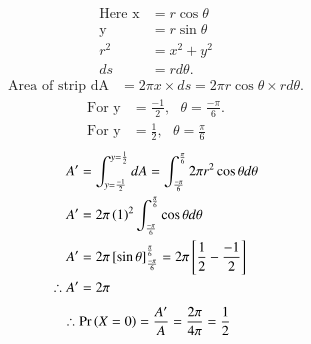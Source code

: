 \documentclass[journal,12pt,twocolumn]{IEEEtran}
\begin{document}
\begin{align}
\text{Here x} &= r\cos{\theta}
\\\text{y} &=r\sin{\theta}
\\r^2 &= x^2 + y^2
\\ds &= rd\theta.
\end{align}
\begin{align}
    \text{Area of strip dA} &= 2\pi x\times ds
    = 2\pi  r\cos{\theta} \times rd\theta.
\end{align}
\begin{align}
    \text{For y} &=\frac{-1}{2}, \text{ }\theta = \frac{-\pi}{6}.
    \\\text{For y} &=\frac{1}{2}, \text{ }\theta = \frac{\pi}{6} 
\end{align}
\begin{align}
    A^\prime &= \int_{y = \frac{-1}{2}}^{y = \frac{1}{2}} dA = \int_{\frac{-\pi}{6}}^{\frac{\pi}{6}} 2\pi r^2 \cos{\theta} d\theta
    \\A^\prime &= 2\pi \left(1\right)^2 \int_{\frac{-\pi}{6}}^{\frac{\pi}{6}} \cos{\theta} d\theta
    \\A^\prime &= 2\pi {}\left[\sin{\theta}\right]_\frac{-\pi}{6}^\frac{\pi}{6} = 2\pi {}\left[\frac{1}{2} - \frac{-1}{2}\right]
    \\\therefore A^\prime &= 2\pi
\end{align}
\begin{align}
    \therefore \Pr\left(X = 0\right) &= \frac{A^\prime}{A} = \frac{2\pi}{4\pi} = \frac{1}{2}
\end{align}
\end{document}
